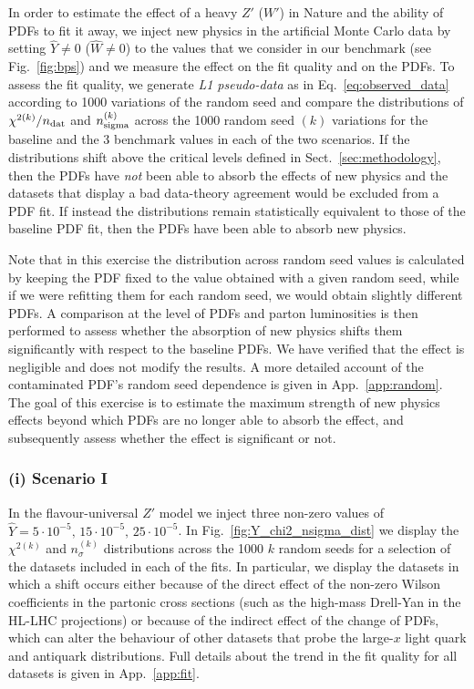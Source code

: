 \documentclass[withindex,glossary]{cam-thesis}
\begin{document}
In order to estimate the effect of a heavy $Z'$ ($W'$) in Nature and the ability of PDFs
to fit it away, we inject new physics in the artificial Monte Carlo data by setting $\hat{Y}\neq
0$ ($\hat{W}\neq 0$) to the values that we consider in our benchmark (see
Fig.~\ref{fig:bps}) and we measure the effect on the fit
quality and on the PDFs. To assess the fit quality, we generate
{\it L1 pseudo-data} as in Eq.~\eqref{eq:observed_data} according to
1000 variations of the random seed and compare the distributions of
$\chi^{2(k)}/n_{\rm dat}$ and $n^{(k)}_{\rm sigma}$ across the 1000
random seed $(k)$ variations for the
baseline and the 3 benchmark values in each of the two
scenarios.
If the distributions shift above the critical levels defined in
Sect.~\ref{sec:methodology}, then the PDFs have {\it not} been able to absorb
the effects of new physics and the datasets that display a bad
data-theory agreement would be excluded from a PDF fit. If instead the
distributions remain statistically equivalent to those of the baseline
PDF fit, then the PDFs have been able to absorb new physics.

Note that in this exercise the distribution across random seed values is calculated by keeping the PDF fixed
to the value obtained with a given random seed, while if we were
refitting them for each random seed, we would obtain slightly
different PDFs. A comparison at the level of PDFs and parton luminosities is then performed to
assess whether the absorption of new physics shifts them significantly with
respect to the baseline PDFs. We have verified that the effect is negligible and
does not modify the results. A more detailed account of the contaminated PDF's random
seed dependence is given in App.~\ref{app:random}. 
The goal of this exercise is to estimate the maximum strength of new physics
effects beyond which PDFs are no longer able to absorb the effect, and
subsequently assess whether the effect is significant or not.\\



\subsubsection*{(i) Scenario I}

\noindent In the flavour-universal $Z'$ model we inject three non-zero
values of $\hat{Y}=5\cdot 10^{-5},\, 15\cdot 10^{-5},\, 25\cdot
10^{-5}$. In Fig.~\ref{fig:Y_chi2_nsigma_dist} we display 
the $\chi^{2(k)}$ and $n_{\sigma}^{(k)}$ distributions
across the 1000 $k$ random seeds for a selection of the datasets
included in each of the fits. In particular, we display the datasets in
which a shift occurs either because of the direct effect of the
non-zero Wilson coefficients in the partonic cross sections (such as
the high-mass Drell-Yan in the HL-LHC projections) or
because of the indirect effect of the change of PDFs, which can alter the behaviour of other datasets
that probe the large-$x$ light quark and antiquark distributions. Full
details about the trend in the fit quality for all datasets is
given in App.~\ref{app:fit}.
\end{document}

